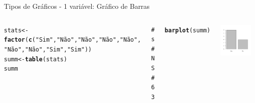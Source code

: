 \documentclass{beamer}\usepackage[]{graphicx}\usepackage[]{color}
\makeatletter
\newcommand{\hlstr}[1]{\textcolor[rgb]{0.192,0.494,0.8}{#1}}%
\newcommand{\hlstd}[1]{\textcolor[rgb]{0.345,0.345,0.345}{#1}}%
\newcommand{\hlkwb}[1]{\textcolor[rgb]{0.69,0.353,0.396}{#1}}%
\newcommand{\hlkwd}[1]{\textcolor[rgb]{0.737,0.353,0.396}{\textbf{#1}}}%
\newenvironment{kframe}{%
 \def\at@end@of@kframe{}%
 \ifinner\ifhmode%
  \def\at@end@of@kframe{\end{minipage}}%
  \begin{minipage}{\columnwidth}%
 \fi\fi%
 \def\FrameCommand##1{\hskip\@totalleftmargin \hskip-\fboxsep
 \colorbox{shadecolor}{##1}\hskip-\fboxsep
     \hskip-\linewidth \hskip-\@totalleftmargin \hskip\columnwidth}%
 \MakeFramed {\advance\hsize-\width
   \@totalleftmargin\z@ \linewidth\hsize
   \@setminipage}}%
 {\par\unskip\endMakeFramed%
 \at@end@of@kframe}
\newenvironment{knitrout}{}{} %
\renewenvironment{knitrout}{\setlength{\topsep}{0mm}}{}
\makeatother
\begin{document}
\begin{frame}[fragile]{Tipos de Gráficos - 1 variável: Gráfico de Barras}

\begin{columns}[t]

\begin{knitrout}\tiny
{}\color{fgcolor}\begin{kframe}
\begin{alltt}
\hlstd{stats} \hlkwb{<-} \hlkwd{factor}\hlstd{(}\hlkwd{c}\hlstd{(}\hlstr{"Sim"}\hlstd{,}\hlstr{"Não"}\hlstd{,}\hlstr{"Não"}\hlstd{,}\hlstr{"Não"}\hlstd{,}\hlstr{"Não"}\hlstd{,}
                 \hlstr{"Não"}\hlstd{,}\hlstr{"Não"}\hlstd{,}\hlstr{"Sim"}\hlstd{,}\hlstr{"Sim"}\hlstd{))}
\hlstd{summ} \hlkwb{<-} \hlkwd{table}\hlstd{(stats)}
\hlstd{summ}
\end{alltt}
\begin{verbatim}
## stats
## Não Sim 
##   6   3
\end{verbatim}
\begin{alltt}
\hlkwd{barplot}\hlstd{(summ)}
\end{alltt}
\end{kframe}
\end{knitrout}


\begin{knitrout}
\color{fgcolor}
\includegraphics[width=1\linewidth]{figure/unnamed-chunk-47-1} 

\end{knitrout}

\end{columns}

\end{frame}
\end{document}
